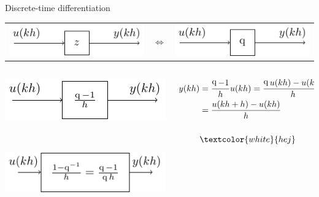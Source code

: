 \documentclass[presentation,aspectratio=1610]{beamer}
\DeclareMathOperator{\shift}{q}
\begin{document}
\begin{frame}[label={sec:orge36f0a5}]{Discrete-time differentiation}
\begin{center}
\begin{tabular}{lll}
\includegraphics[width=0.3\linewidth]{../../figures/block-simple-shift-z} & \(\Leftrightarrow\) & \includegraphics[width=0.3\linewidth]{../../figures/block-simple-shift}\\
\end{tabular}
\end{center}



\begin{columns}
\begin{column}{0.4\columnwidth}
\vspace*{5mm}

\includegraphics[width=\linewidth]{../../figures/block-simple-discrete-derivative-fwd}

\textcolor{white}{Space}

\begin{center}
\includegraphics[width=\linewidth]{../../figures/block-simple-discrete-derivative}
\end{center}
\end{column}

\begin{column}{0.6\columnwidth}
\begin{align*}
y(kh) &= \frac{\shift-1}{h} u(kh) = \frac{\shift u(kh) - u(kh)}{h}\\ &= \frac{u(kh + h) - u(kh)}{h}\\\\
&\textcolor{white}{hej}
\end{align*}
\end{column}
\end{columns}
\end{frame}
\end{document}
